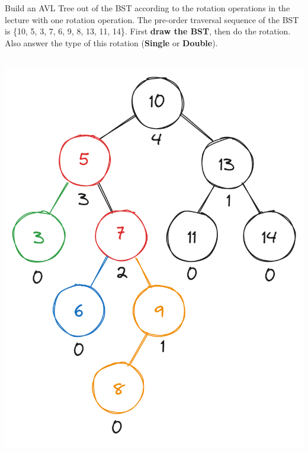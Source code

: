 \noindent {} 
Build an AVL Tree out of the BST according to the rotation operations in the lecture with one rotation operation. The pre-order traversal sequence of the BST is \{10, 5, 3, 7, 6, 9, 8, 13, 11, 14\}. First \textbf{draw the BST}, then do the rotation. Also answer the type of this rotation (\textbf{Single} or \textbf{Double}). \\
 \\
\begin{minipage}[t]{.4\textwidth}
    \vspace{0pt}
    \centering
    \includegraphics[width=\linewidth]{HWs//HW7//figures/2_1.png}
\end{minipage}
\hspace{30pt}
